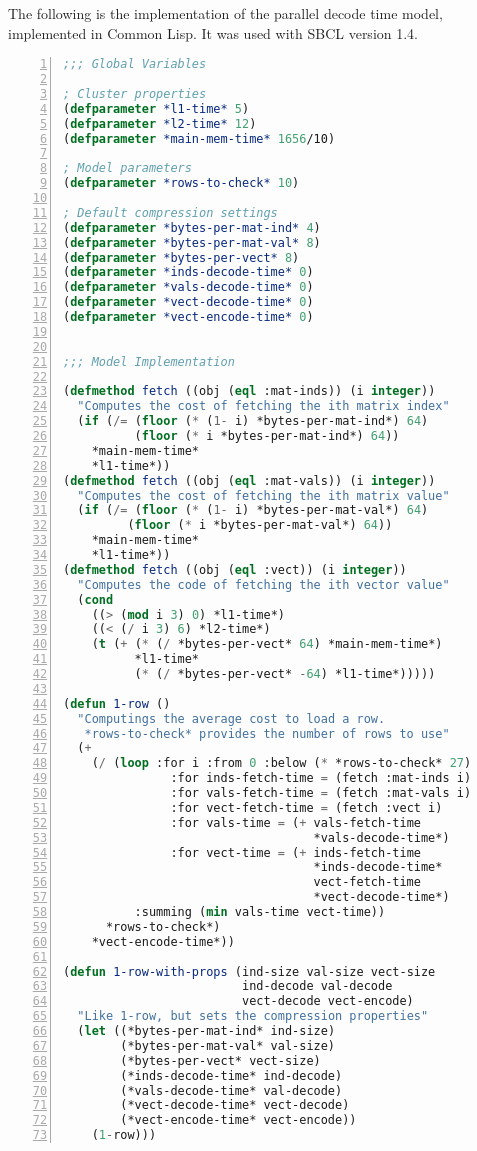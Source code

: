 The following is the implementation of the parallel decode time model, implemented in Common Lisp.
It was used with SBCL version 1.4.

\begin{lstlisting}[language=Lisp,
					showstringspaces=false,
					numbers=left,
					numberstyle=\tiny]
;;; Global Variables

; Cluster properties
(defparameter *l1-time* 5)
(defparameter *l2-time* 12)
(defparameter *main-mem-time* 1656/10)

; Model parameters
(defparameter *rows-to-check* 10)

; Default compression settings
(defparameter *bytes-per-mat-ind* 4)
(defparameter *bytes-per-mat-val* 8)
(defparameter *bytes-per-vect* 8)
(defparameter *inds-decode-time* 0)
(defparameter *vals-decode-time* 0)
(defparameter *vect-decode-time* 0)
(defparameter *vect-encode-time* 0)


;;; Model Implementation

(defmethod fetch ((obj (eql :mat-inds)) (i integer))
  "Computes the cost of fetching the ith matrix index"
  (if (/= (floor (* (1- i) *bytes-per-mat-ind*) 64)
          (floor (* i *bytes-per-mat-ind*) 64))
    *main-mem-time*
    *l1-time*))
(defmethod fetch ((obj (eql :mat-vals)) (i integer))
  "Computes the cost of fetching the ith matrix value"
  (if (/= (floor (* (1- i) *bytes-per-mat-val*) 64)
         (floor (* i *bytes-per-mat-val*) 64))
    *main-mem-time*
    *l1-time*))
(defmethod fetch ((obj (eql :vect)) (i integer))
  "Computes the code of fetching the ith vector value"
  (cond
    ((> (mod i 3) 0) *l1-time*)
    ((< (/ i 3) 6) *l2-time*)
    (t (+ (* (/ *bytes-per-vect* 64) *main-mem-time*)
          *l1-time*
          (* (/ *bytes-per-vect* -64) *l1-time*)))))

(defun 1-row ()
  "Computings the average cost to load a row.
   *rows-to-check* provides the number of rows to use"
  (+
    (/ (loop :for i :from 0 :below (* *rows-to-check* 27)
               :for inds-fetch-time = (fetch :mat-inds i)
               :for vals-fetch-time = (fetch :mat-vals i)
               :for vect-fetch-time = (fetch :vect i)
               :for vals-time = (+ vals-fetch-time
                                   *vals-decode-time*)
               :for vect-time = (+ inds-fetch-time
                                   *inds-decode-time*
                                   vect-fetch-time
                                   *vect-decode-time*)
          :summing (min vals-time vect-time))
      *rows-to-check*)
    *vect-encode-time*))

(defun 1-row-with-props (ind-size val-size vect-size
                         ind-decode val-decode
                         vect-decode vect-encode)
  "Like 1-row, but sets the compression properties"
  (let ((*bytes-per-mat-ind* ind-size)
        (*bytes-per-mat-val* val-size)
        (*bytes-per-vect* vect-size)
        (*inds-decode-time* ind-decode)
        (*vals-decode-time* val-decode)
        (*vect-decode-time* vect-decode)
        (*vect-encode-time* vect-encode))
    (1-row)))

\end{lstlisting}